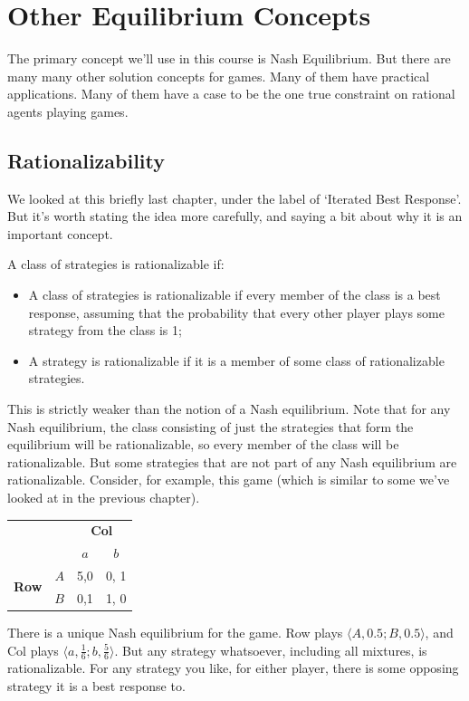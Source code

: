 \documentclass[openany]{book}
\begin{document}
\chapter{Other Equilibrium Concepts}

The primary concept we'll use in this course is Nash Equilibrium. But there are many many other solution concepts for games. Many of them have practical applications. Many of them have a case to be the one true constraint on rational agents playing games.

\section{Rationalizability}

We looked at this briefly last chapter, under the label of `Iterated Best Response'. But it's worth stating the idea more carefully, and saying a bit about why it is an important concept.

A class of strategies is rationalizable if:

\begin{itemize}
\item A class of strategies is rationalizable if every member of the class is a best response, assuming that the probability that every other player plays some strategy from the class is 1;
\item A strategy is rationalizable if it is a member of some class of rationalizable strategies.
\end{itemize}
This is strictly weaker than the notion of a Nash equilibrium. Note that for any Nash equilibrium, the class consisting of just the strategies that form the equilibrium will be rationalizable, so every member of the class will be rationalizable. But some strategies that are not part of any Nash equilibrium are rationalizable. Consider, for example, this game (which is similar to some we've looked at in the previous chapter).

\begin{center}
\begin{tabular}{l r | c c}
& & \multicolumn{2}{c}{\textbf{Col}} \\
& & $a$ & $b$  \\ \hline
\multirow{2}{*}{\textbf{Row}}
& $A$ & 5,0 & 0, 1 \\
& $B$ & 0,1 & 1, 0
\end{tabular}
\end{center}
There is a unique Nash equilibrium for the game. Row plays $\langle A, 0.5; B, 0.5 \rangle$, and Col plays $\langle a, \frac{1}{6}; b, \frac{5}{6} \rangle$. But any strategy whatsoever, including all mixtures, is rationalizable. For any strategy you like, for either player, there is some opposing strategy it is a best response to.
\end{document}
